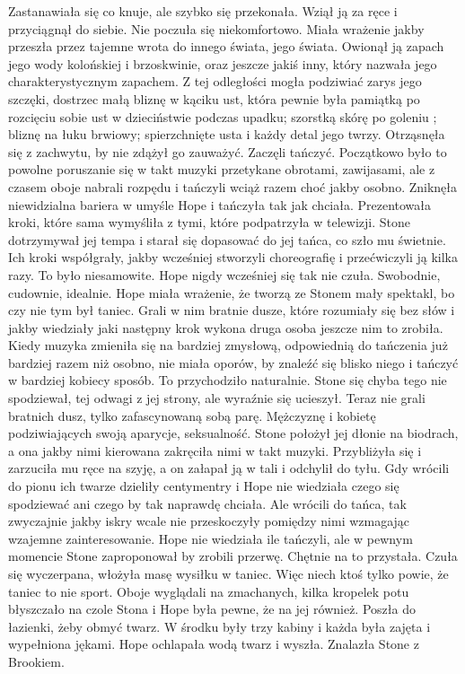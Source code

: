 \documentclass[12pt,a4paper]{book}
\begin{document}
Zastanawiała się co knuje, ale szybko się przekonała. Wziął ją za ręce i przyciągnął do siebie. Nie poczuła się niekomfortowo. Miała wrażenie jakby przeszła przez tajemne wrota do innego świata, jego świata. Owionął ją zapach jego wody kolońskiej i brzoskwinie, oraz jeszcze jakiś inny, który nazwała jego charakterystycznym zapachem. Z tej odległości mogła podziwiać zarys jego szczęki, dostrzec małą bliznę w kąciku ust, która pewnie była pamiątką po rozcięciu sobie ust w dzieciństwie podczas upadku; szorstką skórę po goleniu ; bliznę na łuku brwiowy; spierzchnięte usta i każdy detal jego twrzy. Otrząsnęła się z zachwytu, by nie zdążył go zauważyć. Zaczęli tańczyć. Początkowo było to powolne poruszanie się w takt muzyki przetykane obrotami, zawijasami, ale z czasem oboje nabrali rozpędu i tańczyli wciąż razem choć jakby osobno. Zniknęła niewidzialna bariera w umyśle Hope i tańczyła tak jak chciała. Prezentowała kroki, które sama wymyśliła z tymi, które podpatrzyła w telewizji. Stone dotrzymywał jej tempa i starał się dopasować do jej tańca, co  szło mu świetnie. Ich kroki współgrały, jakby wcześniej stworzyli choreografię i przećwiczyli ją kilka razy. To było niesamowite. Hope nigdy wcześniej się tak nie czuła. Swobodnie, cudownie, idealnie. Hope miała wrażenie, że tworzą ze Stonem mały spektakl, bo czy nie tym był taniec. Grali w nim bratnie dusze, które rozumiały się bez słów i jakby wiedziały jaki następny krok wykona druga osoba jeszcze nim to zrobiła. Kiedy muzyka zmieniła się na bardziej zmysłową, odpowiednią do tańczenia już bardziej razem niż osobno, nie miała oporów, by znaleźć się blisko niego i tańczyć w bardziej kobiecy sposób. To przychodziło naturalnie. Stone się chyba tego nie spodziewał, tej odwagi z jej strony, ale wyraźnie się ucieszył. Teraz nie grali bratnich dusz, tylko zafascynowaną sobą parę. Mężczyznę i kobietę podziwiających swoją aparycje, seksualność. Stone położył jej dłonie na biodrach, a ona jakby nimi kierowana zakręciła nimi w takt muzyki. Przybliżyła się i zarzuciła mu ręce na szyję, a on załapał ją w tali i odchylił do tyłu. Gdy wrócili do pionu ich twarze dzieliły centymentry i Hope nie wiedziała czego się spodziewać ani czego by tak naprawdę chciała. Ale wrócili do tańca, tak zwyczajnie jakby iskry wcale nie przeskoczyły pomiędzy nimi wzmagając wzajemne zainteresowanie. 
Hope nie wiedziała ile tańczyli, ale w pewnym momencie Stone zaproponował by zrobili przerwę. Chętnie na to przystała. Czuła się wyczerpana, włożyła masę wysiłku w taniec. Więc niech ktoś tylko powie, że taniec to nie sport. Oboje wyglądali na zmachanych, kilka kropelek potu błyszczało na czole Stona i Hope była pewne, że na jej również. Poszła do łazienki, żeby obmyć twarz. W środku były trzy kabiny i każda była zajęta i wypełniona jękami. Hope ochlapała wodą twarz i wyszła. Znalazła Stone z Brookiem. 
\end{document}
